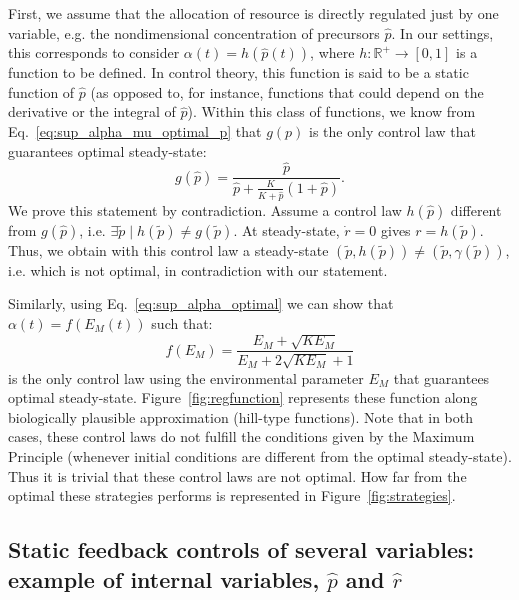 First, we assume that the allocation of resource is directly regulated just by one variable, e.g. the nondimensional concentration of precursors $\hat{p}$.
In our settings, this corresponds to consider $\alpha(t)=h(\hat{p}(t))$, where $h:\mathbb{R}^+\rightarrow [0,1]$ is a function to be defined.
In control theory, this function is said to be a static function of $\hat{p}$ (as opposed to, for instance, functions that could depend on the derivative or the integral of $\hat{p}$).
Within this class of functions, we know from Eq.~\ref{eq:sup_alpha_mu_optimal_p} that $g(p)$ is the only control law that guarantees optimal steady-state:
\begin{equation}
\label{eq:supp_g}
g(\hat{p}) = \frac{\hat{p}}{\hat{p} + \frac{K}{K + \hat{p}}(1+\hat{p})}.
\end{equation}
We prove this statement by contradiction. Assume a control law $h(\hat{p})$ different from $g(\hat{p})$, i.e. $\exists \tilde p \mid h(\tilde p)\neq g(\tilde p)$. At steady-state, $\dot r=0$ gives $r=h(\tilde p)$. Thus, we obtain with this control law a steady-state $(\tilde p,h(\tilde p))\neq(\tilde p,\gamma(\tilde p))$, i.e. which is not optimal, in contradiction with our statement.

Similarly, using Eq.~\ref{eq:sup_alpha_optimal} we can show that $\alpha(t)=f(E_M(t))$ such that:
\begin{equation}
\label{eq:supp_f}
f(E_M) = \frac{E_M + \sqrt{K E_M}}{E_M + 2\sqrt{KE_M} + 1}
\end{equation}
is the only control law using the environmental parameter $E_M$ that guarantees optimal steady-state.
Figure~\ref{fig:regfunction} represents these function along biologically plausible approximation (hill-type functions).
Note that in both cases, these control laws do not fulfill the conditions given by the Maximum Principle (whenever initial conditions are different from the optimal steady-state).
Thus it is trivial that these control laws are not optimal.
How far from the optimal these strategies performs is represented in Figure~\ref{fig:strategies}.

\subsection{Static feedback controls of several variables: example of internal variables, \texorpdfstring{$\hat{p}$}{p} and \texorpdfstring{$\hat{r}$}{r}}
